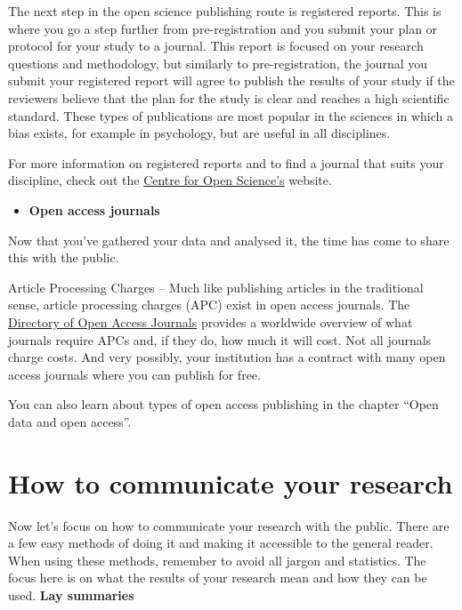 \documentclass[
]{book}
\providecommand{\tightlist}{%
  \setlength{\itemsep}{0pt}\setlength{\parskip}{0pt}}
\begin{document}
The next step in the open science publishing route is registered reports. This is where you go a step further from pre-registration and you submit your plan or protocol for your study to a journal. This report is focused on your research questions and methodology, but similarly to pre-registration, the journal you submit your registered report will agree to publish the results of your study if the reviewers believe that the plan for the study is clear and reaches a high scientific standard. These types of publications are most popular in the sciences in which a bias exists, for example in psychology, but are useful in all disciplines.

For more information on registered reports and to find a journal that suits your discipline, check out the \href{https://www.cos.io/initiatives/registered-reports}{Centre for Open Science's} website.

\begin{itemize}
\tightlist
\item
  \textbf{Open access journals}
\end{itemize}

Now that you've gathered your data and analysed it, the time has come to share this with the public.

Article Processing Charges -- Much like publishing articles in the traditional sense, article processing charges (APC) exist in open access journals. The \href{https://doaj.org/}{Directory of Open Access Journals} provides a worldwide overview of what journals require APCs and, if they do, how much it will cost. Not all journals charge costs. And very possibly, your institution has a contract with many open access journals where you can publish for free.

You can also learn about types of open access publishing in the chapter ``Open data and open access''.

\hypertarget{how-to-communicate-your-research}{%
\section{How to communicate your research}\label{how-to-communicate-your-research}}

Now let's focus on how to communicate your research with the public. There are a few easy methods of doing it and making it accessible to the general reader. When using these methods, remember to avoid all jargon and statistics. The focus here is on what the results of your research mean and how they can be used. \textbf{Lay summaries}
\end{document}
